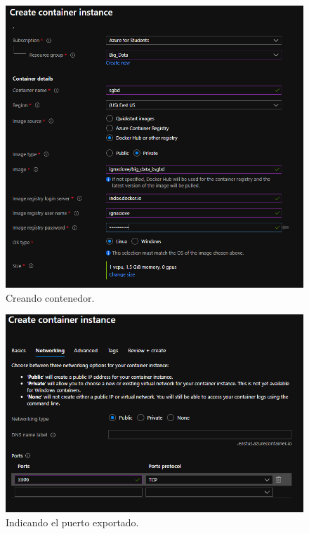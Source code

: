 \begin{figure}[H]\center\includegraphics[width=.95\linewidth]{img/sgbd/s5.png}\caption{Creando contenedor.}\end{figure}

\begin{figure}[H]\center\includegraphics[width=.95\linewidth]{img/sgbd/s6.png}\caption{Indicando el puerto exportado.}\end{figure}

